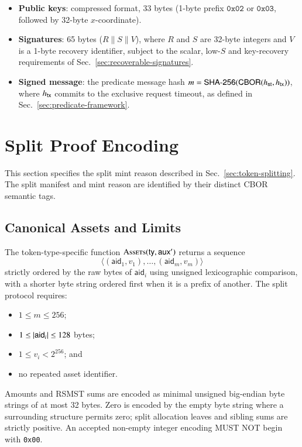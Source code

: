 \begin{itemize}
	\item \textbf{Public keys}: compressed format, 33 bytes (1-byte prefix $\texttt{0x02}$ or $\texttt{0x03}$, followed by 32-byte $x$-coordinate).
	\item \textbf{Signatures}: 65 bytes ($R \mathbin{\|} S \mathbin{\|} V$), where $R$ and $S$ are 32-byte integers and $V$ is a 1-byte recovery identifier, subject to the scalar, low-$S$ and key-recovery requirements of Sec.~\ref{sec:recoverable-signatures}.
	\item \textbf{Signed message}: the predicate message hash $m = \mathsf{SHA\text{-}256}(\mathsf{CBOR}({h_\mathsf{st}}, {h_\mathsf{tx}}))$, where ${h_\mathsf{tx}}$ commits to the exclusive request timeout, as defined in Sec.~\ref{sec:predicate-framework}.
\end{itemize}


\section{Split Proof Encoding}\label{app:split-proof-encoding}

This section specifies the split mint reason described in Sec.~\ref{sec:token-splitting}. The split manifest and mint reason are identified by their distinct CBOR semantic tags.

\subsection{Canonical Assets and Limits}

The token-type-specific function $\Call{Assets}{\mathsf{ty},\auxd'}$ returns a sequence
\[
\langle(\mathsf{aid}_1,v_1),\ldots,(\mathsf{aid}_m,v_m)\rangle
\]
strictly ordered by the raw bytes of $\mathsf{aid}_i$ using unsigned lexicographic comparison, with a shorter byte string ordered first when it is a prefix of another. The split protocol requires:
\begin{itemize}
	\item $1 \leq m \leq 256$;
	\item $1 \leq \left|\mathsf{aid}_i\right| \leq 128$ bytes;
	\item $1 \leq v_i < 2^{256}$; and
	\item no repeated asset identifier.
\end{itemize}
Amounts and RSMST sums are encoded as minimal unsigned big-endian byte strings of at most 32 bytes. Zero is encoded by the empty byte string where a surrounding structure permits zero; split allocation leaves and sibling sums are strictly positive. An accepted non-empty integer encoding MUST NOT begin with \texttt{0x00}.

